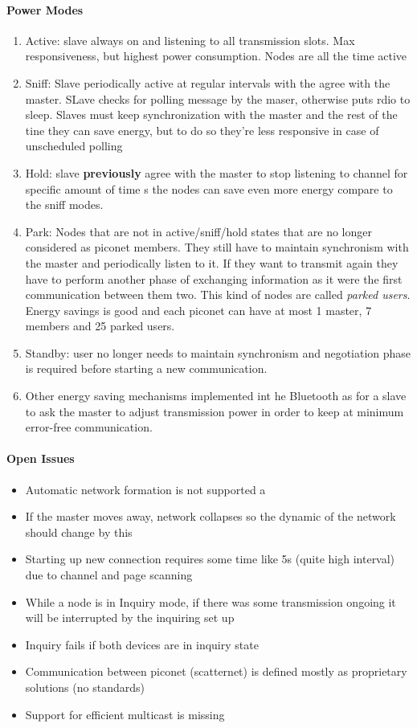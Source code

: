 \paragraph{Power Modes}
\begin{enumerate}
\item Active: slave always on and listening to all transmission slots. Max responsiveness, but highest power consumption. Nodes are all the time active
\item Sniff: Slave periodically active at regular intervals with the agree with the master. SLave checks for polling message by the maser, otherwise puts rdio to sleep. Slaves must keep synchronization with the master and the rest of the tine they can save energy, but to do so they're less responsive in case of unscheduled polling
\item Hold: slave \textbf{previously} agree with the master to stop listening to channel for specific amount of time  s the nodes can save even more energy compare to the sniff modes. 
\item Park: Nodes that are not in active/sniff/hold states that are no longer considered as piconet members. They still have to maintain synchronism with the master and periodically listen to it. If they want to transmit again they have to perform another phase of exchanging information as it were the first communication between them two. This kind of nodes are called \emph{parked users}. Energy savings is good and each piconet can have at most 1 master, 7 members and 25 parked users.  
\item Standby: user no longer needs to maintain synchronism and negotiation phase is required before starting a new communication. 
\item Other energy saving mechanisms implemented int he Bluetooth as for a slave to ask the master to adjust transmission power in order to keep at minimum error-free communication. 
\end{enumerate}

\paragraph{Open Issues}
\begin{itemize}
\item Automatic network formation is not supported a
\item If the master moves away, network collapses so  the dynamic of the network should change by this
\item Starting up new connection requires some time like 5s (quite high interval) due to channel and page scanning
\item While a node is in Inquiry mode, if there was some transmission ongoing it will be interrupted by the inquiring set up
\item Inquiry fails if both devices are in inquiry state
\item Communication between piconet (scatternet) is defined mostly as proprietary solutions (no standards)
\item Support for efficient multicast is missing
\end{itemize}


